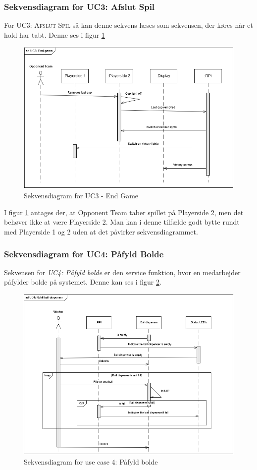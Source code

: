 \documentclass[Rapport/Rapport_main.tex]{subfiles}
\begin{document}
\subsubsection{Sekvensdiagram for UC3: Afslut Spil}
For \textsc{UC3: Afslut Spil} så kan denne sekvens læses som sekvensen, der køres når et hold har tabt. Denne ses i figur \ref{fig:rap_sd_UC3}
\begin{figure}
    \centering 
    \includegraphics[width=\linewidth]{Arkitektur/Sekvensdiagrammer/graphics/sd_UC3.png}
    \caption{Sekvensdiagram for UC3 - End Game}
    \label{fig:rap_sd_UC3}
\end{figure}
I figur \ref{fig:rap_sd_UC3} antages der, at Opponent Team taber spillet på Playerside 2, men det behøver ikke at være Playerside 2. Man kan i denne tilfælde godt bytte rundt med Playerside 1 og 2 uden at det påvirker sekvensdiagrammet.

\subsubsection{Sekvensdiagram for UC4: Påfyld Bolde}
Sekvensen for \textit{UC4: Påfyld bolde} er den service funktion, hvor en medarbejder påfylder bolde på systemet. Denne kan ses i figur \ref{fig:rap_sd_UC4}.
\begin{figure}[H]
    \centering
    \includegraphics[scale=0.9]{Arkitektur/Sekvensdiagrammer/graphics/sd_UC4.png}
    \caption{Sekvensdiagram for use case 4: Påfyld bolde}
    \label{fig:rap_sd_UC4}
\end{figure}
\end{document}
